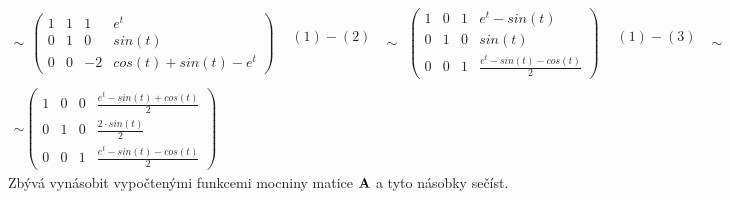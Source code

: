 \begin{equation*}
\begin{array}{l}
\sim
 \begin{array}{lc}
  \left(
   \begin{array}{ccc|c}
    1 & 1 & 1 & e^t\\
    0 & 1 & 0 & sin(t)\\
    0 & 0 & -2 & cos(t) + sin(t) - e^t 
   \end{array}
  \right) & 
  \begin{array}{c}
    (1) - (2)\\
    ~\\
    ~ 
  \end{array}
 \end{array}
 \sim
 \begin{array}{lc}
  \left(
   \begin{array}{ccc|c}
    1 & 0 & 1 & e^t - sin(t)\\
    0 & 1 & 0 & sin(t)\\
    0 & 0 & 1 & \frac{e^t - sin(t) -cos(t)}{2}
   \end{array}
  \right) & 
  \begin{array}{c}
    (1) - (3)\\
    ~\\
    ~ 
  \end{array}
 \end{array} \sim\\
 \sim
  \left(
   \begin{array}{ccc|c}
    1 & 0 & 0 & \frac{e^t - sin(t) +cos(t)}{2}\\
    0 & 1 & 0 & \frac{2\cdot sin(t)}{2}\\
    0 & 0 & 1 & \frac{e^t - sin(t) -cos(t)}{2}
   \end{array}
  \right)
\end{array}
\end{equation*}
Zbývá vynásobit vypočtenými funkcemi mocniny matice ${\bf A}$ a tyto násobky sečíst.
